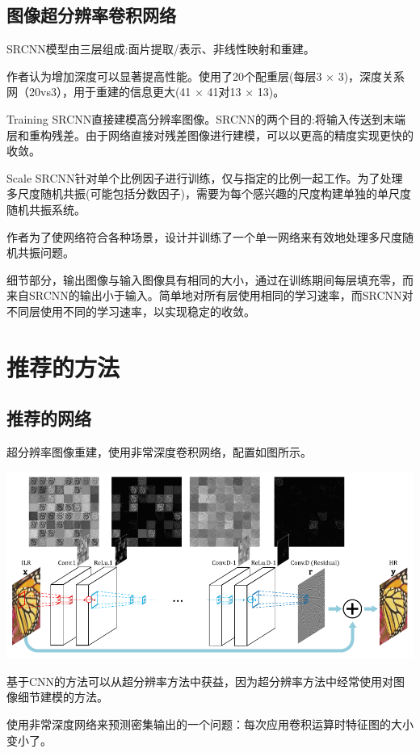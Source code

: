 \documentclass[UTF8,a4paper,10pt]{ctexrep}
\begin{document}
\subsection{图像超分辨率卷积网络}

SRCNN模型由三层组成:面片提取/表示、非线性映射和重建。

作者认为增加深度可以显著提高性能。使用了20个配重层(每层3 × 3)，深度关系网（20vs3），用于重建的信息更大(41 × 41对13 × 13)。

Training SRCNN直接建模高分辨率图像。SRCNN的两个目的:将输入传送到末端层和重构残差。由于网络直接对残差图像进行建模，可以以更高的精度实现更快的收敛。

Scale SRCNN针对单个比例因子进行训练，仅与指定的比例一起工作。为了处理多尺度随机共振(可能包括分数因子)，需要为每个感兴趣的尺度构建单独的单尺度随机共振系统。

作者为了使网络符合各种场景，设计并训练了一个单一网络来有效地处理多尺度随机共振问题。

细节部分，输出图像与输入图像具有相同的大小，通过在训练期间每层填充零，而来自SRCNN的输出小于输入。简单地对所有层使用相同的学习速率，而SRCNN对不同层使用不同的学习速率，以实现稳定的收敛。

\section{推荐的方法}
\subsection{推荐的网络}

超分辨率图像重建，使用非常深度卷积网络，配置如图所示。

\includegraphics[width=\textwidth]{figure/peizhi.png}

基于CNN的方法可以从超分辨率方法中获益，因为超分辨率方法中经常使用对图像细节建模的方法。

使用非常深度网络来预测密集输出的一个问题：每次应用卷积运算时特征图的大小变小了。
\end{document}
